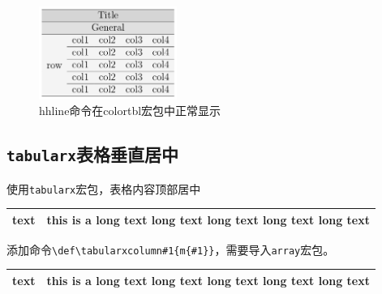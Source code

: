 \begin{figure}[!h]
    \centering
    \includegraphics[width=0.4\textwidth]{figure/chap-tab/cline-colortbl-sol.png}
    \caption{{hhline}命令在{colortbl}宏包中正常显示}
    \label{fig:cline-colortbl-sol}
\end{figure}

\subsection{\lstinline|tabularx|表格垂直居中}\label{subsec:tabularx-center}

使用\lstinline{tabularx}宏包，表格内容顶部居中

\begin{codeshow}
    \begin{tabularx}{0.3\textwidth}{|X|X|}
        \hline
        text & this is a long text long 
        text long text long text long text\\
        \hline
    \end{tabularx}
\end{codeshow}


添加命令\lstinline|\def\tabularxcolumn#1{m{#1}}|，需要导入\lstinline{array}宏包。

\begin{codeshow}
    \def\tabularxcolumn#1{m{#1}}
    \begin{tabularx}{0.3\textwidth}{|X|X|}
        \hline
        text & this is a long text long 
        text long text long text long text\\
        \hline
    \end{tabularx}
\end{codeshow}